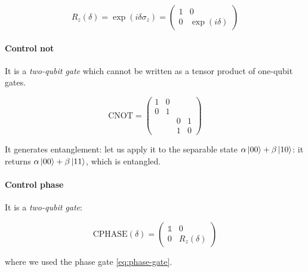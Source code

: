 \documentclass[main.tex]{subfiles}
\begin{document}
\begin{equation} \label{eq:phase-gate}
    R_z (\delta) = \exp(i \delta \sigma_z) = \begin{pmatrix}
    1   & 0 \\
    0   & \exp(i \delta)
    \end{pmatrix}
\end{equation}

\paragraph{Control not} \label{par:cnot}
It is a \emph{two-qubit gate}  which cannot be written as a tensor product of one-qubit gates.

\begin{equation}
    \text{CNOT} = \begin{pmatrix}
    1   &  0 &   &  \\
      0 & 1  &   &  \\
       &   & 0  & 1 \\
       &   & 1  & 0
    \end{pmatrix}
\end{equation}

It generates entanglement: let us apply it to the separable state \(\alpha \ket{00} + \beta \ket{10} \): it returns \(\alpha \ket{00} + \beta \ket{11} \), which is entangled.

\paragraph{Control phase}

It is a \emph{two-qubit gate}:

\begin{equation}
    \text{CPHASE}(\delta) = \begin{pmatrix}
    \mathbb 1   & 0 \\
    0   & R_z(\delta)
    \end{pmatrix}
\end{equation}

where we used the phase gate \eqref{eq:phase-gate}.
\end{document}
